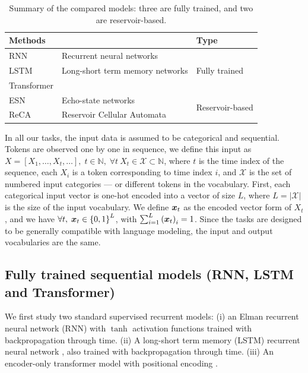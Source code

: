 \begin{table}[htbp]
  \centering
  \begin{tabular}{lll}
    \toprule
    \multicolumn{2}{l}{\bfseries Methods} & \bfseries Type \\
    \midrule
   RNN & Recurrent neural networks  & \multirow{3}{*}{Fully trained}\\
   LSTM & Long-short term memory networks  & \\
   Transformer &  & \\
    \midrule
   ESN & Echo-state networks  & \multirow{2}{*}{Reservoir-based}\\
   ReCA & Reservoir Cellular Automata  & \\
    \bottomrule
  \end{tabular}
  \caption{Summary of the compared models: three are fully trained, and two are
    reservoir-based.}
\label{tab:methods-summary}
\end{table}

In all our tasks, the input data is assumed to be categorical and sequential.
Tokens are observed one by one in sequence, we define this input as
$X = [X_{1}, \ldots, X_{t}, \ldots],\; t\in \mathbb{N}, \; \forall t \ X_{t} \in \mathcal{X} \subset \mathbb{N}$, where $t$ is the
time index of the sequence, each $X_{i}$ is a token corresponding to time index
$i$, and $\mathcal{X}$ is the set of numbered input categories --- or different tokens in the
vocabulary. First, each categorical input vector is one-hot encoded into a
vector of size $L$, where $L = |\mathcal{X}|$ is the size of the input vocabulary. We define
${\bm{x}}_{t}$ as the encoded vector form of $X_{t}$, and we have
$\forall t,\; {\bm{x}}_{t} \in {\{0, 1\}}^{L}$, with $\sum_{i = 1}^{L}{({\bm{x}}_{t})}_{i} = 1$.
Since the tasks are designed to be generally compatible with language modeling,
the input and output vocabularies are the same.

\subsection{Fully trained sequential models (RNN, LSTM and Transformer)}
We first study two standard supervised recurrent models: (i) an Elman recurrent
neural network (RNN) \parencite{elmanFindingStructureTime1990} with $\tanh$
activation functions trained with backpropagation through time. (ii) A
long-short term memory (LSTM) recurrent neural network
\parencite{hochreiterLongShortTermMemory1997}, also trained with backpropagation
through time. (iii) An encoder-only transformer model with positional encoding
\parencite{vaswaniAttentionAllYou2017}.

